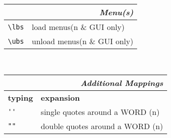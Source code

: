 \documentclass[oneside,11pt,a4paper,DIV18]{scrartcl}
\begin{document}
\begin{center}
\begin{tabular}[]{|p{11mm}|p{59mm}|}
\hline 
\hline
\multicolumn{2}{|r|}{\textsl{Menu(s)}}\\
\hline \verb'\lbs'  & load    menus\hfill \scriptsize{(n \& GUI only)}\\
\hline \verb'\ubs'  & unload  menus\hfill \scriptsize{(n \& GUI only)}\\
\hline 
\end{tabular}\\%
%
\begin{minipage}[b]{70mm}%
\setlength{\fboxsep}{.25mm}%
\begin{spacing}{1.1}%
\begin{tabular}[]{|p{11mm}|p{55mm}|}%
\hline
\multicolumn{2}{|r|}{\textsl{Additional Mappings}}\\
\hline
\hline \textbf{typing}& \textbf{expansion}\\
\hline \verb"''"      & single quotes around a WORD    \hfill (n)\\
\hline \verb'""'      & double quotes around a WORD    \hfill (n)\\
\hline
\end{tabular}
\end{spacing}
\end{minipage}%
%
\end{center}
\end{document}
